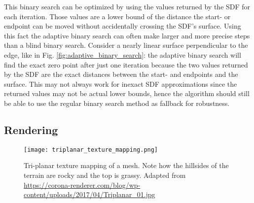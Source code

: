 This binary search can be optimized by using the values returned by the SDF for each iteration. Those values are a lower bound of the distance the start- or endpoint can be moved without accidentally crossing the SDF's surface. Using this fact the adaptive binary search can often make larger and more precise steps than a blind binary search. Consider a nearly linear surface perpendicular to the edge, like in Fig. \ref{fig:adaptive_binary_search}: the adaptive binary search will find the exact zero point after just one iteration because the two values returned by the SDF are the exact distances between the start- and endpoints and the surface. This may not always work for inexact SDF approximations since the returned values may not be actual lower bounds, hence the algorithm should still be able to use the regular binary search method as fallback for robustness.

\subsection{Rendering}
\label{sec:voxel_rendering}

\begin{figure}
\centering
\captionsetup{width=0.8\textwidth}
\texttt{[image: triplanar\_texture\_mapping.png]}
\caption{Tri-planar texture mapping of a mesh. Note how the hillsides of the terrain are rocky and the top is grassy.
Adapted from \url{https://corona-renderer.com/blog/wp-content/uploads/2017/04/Triplanar_01.jpg}}
\label{fig:triplanar_texture_mapping}
\end{figure}

